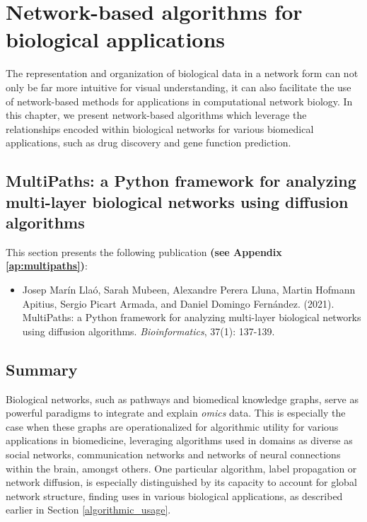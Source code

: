 \chapter{Network-based algorithms for biological applications}
\label{ch:applications}

The representation and organization of biological data in a network form can not only be far more intuitive for visual understanding, it can also facilitate the use of network-based methods for applications in computational network biology. In this chapter, we present network-based algorithms which leverage the relationships encoded within biological networks for various biomedical applications, such as drug discovery and gene function prediction.

\section {MultiPaths: a Python framework for analyzing multi-layer biological networks using diffusion algorithms}

\label{ch:multipaths}

This section presents the following publication \textbf{(see Appendix \ref{ap:multipaths})}:

\begin{itemize}

\item[] Josep Marín Llaó, Sarah Mubeen, Alexandre Perera Lluna, Martin Hofmann Apitius, Sergio Picart Armada, and Daniel Domingo Fernández. (2021). MultiPaths: a Python framework for analyzing multi-layer biological networks using diffusion algorithms. \textit{Bioinformatics}, 37(1): 137-139.

\end{itemize}

\section*{Summary}

Biological networks, such as pathways and biomedical knowledge graphs, serve as powerful paradigms to integrate and explain \textit{omics} data. This is especially the case when these graphs are operationalized for algorithmic utility for various applications in biomedicine, leveraging algorithms used in domains as diverse as social networks, communication networks and networks of neural connections within the brain, amongst others. One particular algorithm, label propagation or network diffusion, is especially distinguished by its capacity to account for global network structure, finding uses in various biological applications, as described earlier in Section \ref{algorithmic_usage}. 

